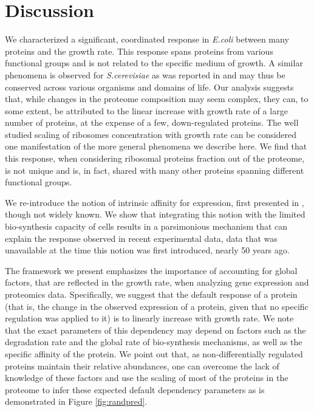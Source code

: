 \section{Discussion}
We characterized a significant, coordinated response in \emph{E.coli} between many proteins and the growth rate.
This response spans proteins from various functional groups and is not related to the specific medium of growth.
A similar phenomena is observed for \emph{S.cerevisiae} as was reported in \cite{Keren2013a} and may thus be conserved across various organisms and domains of life.
Our analysis suggests that, while changes in the proteome composition may seem complex, they can, to some extent, be attributed to the linear increase with growth rate of a large number of proteins, at the expense of a few, down-regulated proteins.
The well studied scaling of ribosomes concentration with growth rate can be considered one manifestation of the more general phenomena we describe here.
We find that this response, when considering ribosomal proteins fraction out of the proteome, is not unique and is, in fact, shared with many other proteins spanning different functional groups.

We re-introduce the notion of intrinsic affinity for expression, first presented in \cite{Maaloe1969}, though not widely known.
We show that integrating this notion with the limited bio-synthesis capacity of cells results in a parsimonious mechanism that can explain the response observed in recent experimental data, data that was unavailable at the time this notion was first introduced, nearly 50 years ago.


The framework we present emphasizes the importance of accounting for global factors, that are reflected in the growth rate, when analyzing gene expression and proteomics data.
Specifically, we suggest that the default response of a protein (that is, the change in the observed expression of a protein, given that no specific regulation was applied to it) is to linearly increase with growth rate.
We note that the exact parameters of this dependency may depend on factors such as the degradation rate and the global rate of bio-synthesis mechanisms, as well as the specific affinity of the protein.
We point out that, as non-differentially regulated proteins maintain their relative abundances, one can overcome the lack of knowledge of these factors and use the scaling of most of the proteins in the proteome to infer these expected default dependency parameters as is demonstrated in Figure \ref{fig:randpred}.

